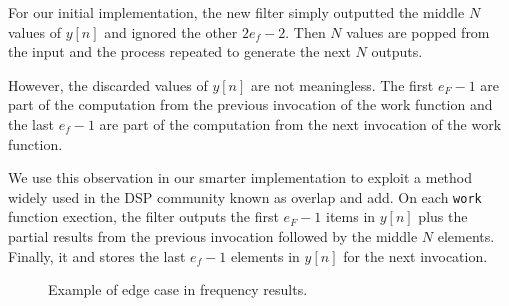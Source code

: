 For our initial implementation, the new filter simply outputted the middle $N$ values of
$y[n]$ and ignored the other $2e_f-2$. Then $N$ values are popped from the input and 
the process repeated to generate the next $N$ outputs.

However, the discarded values of $y[n]$ are not meaningless. The first $e_F-1$ are part of the 
computation from the previous invocation of the work function and the last $e_f-1$ are part
of the computation from the next invocation of the work function. 

We use this observation in our smarter implementation to exploit a method widely used 
in the DSP community known as overlap and add. On each {\tt work} function exection, 
the filter outputs the first $e_F-1$ items in $y[n]$ plus the partial results from 
the previous invocation followed by the middle $N$ elements. Finally, it 
and stores the last $e_f-1$ elements in $y[n]$ for the next invocation.

\begin{figure}
\center
\epsfxsize=3.0in
\caption{Example of edge case in frequency results.}
\label{fig:frequency-example}
\end{figure}

